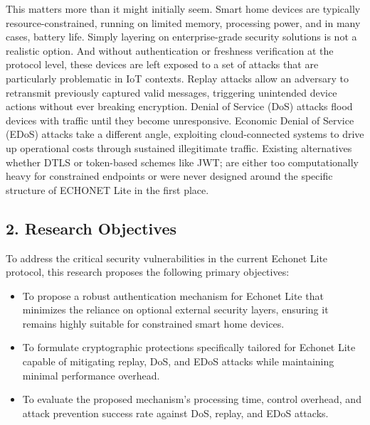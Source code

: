 \documentclass[11pt,a4paper]{article}
\begin{document}
\begin{sectioncard}
This matters more than it might initially seem. Smart home devices are typically
resource-constrained, running on limited memory, processing power, and in many cases, battery
life. Simply layering on enterprise-grade security solutions is not a realistic option. And without
authentication or freshness verification at the protocol level, these devices are left exposed to a
set of attacks that are particularly problematic in IoT contexts. Replay attacks allow an adversary
to retransmit previously captured valid messages, triggering unintended device actions without
ever breaking encryption. Denial of Service (DoS) attacks flood devices with traffic until they
become unresponsive. Economic Denial of Service (EDoS) attacks take a different angle,
exploiting cloud-connected systems to drive up operational costs through sustained illegitimate
traffic. Existing alternatives whether DTLS or token-based schemes like JWT; are either too
computationally heavy for constrained endpoints or were never designed around the specific
structure of ECHONET Lite in the first place.

\end{sectioncard}

\begin{sectioncard}
\section*{2. Research Objectives}
To address the critical security vulnerabilities in the current Echonet Lite protocol, this research proposes the following primary objectives:
\begin{itemize}
    \item To propose a robust authentication mechanism for Echonet Lite that minimizes the reliance on optional external security layers, ensuring it remains highly suitable for constrained smart home devices.
    \item To formulate cryptographic protections specifically tailored for Echonet Lite capable of mitigating replay, DoS, and EDoS attacks while maintaining minimal performance overhead.
    \item To evaluate the proposed mechanism's processing time, control overhead, and attack prevention success rate against DoS, replay, and EDoS attacks.
\end{itemize}
\end{sectioncard}
\end{document}
